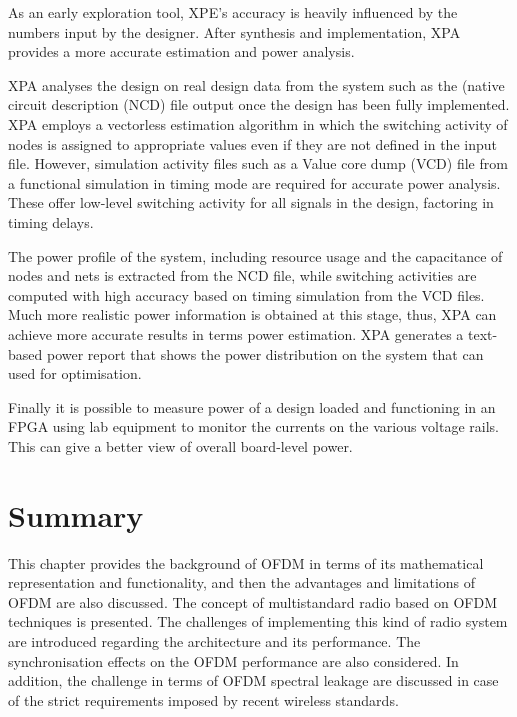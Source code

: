 As an early exploration tool, XPE's accuracy is heavily influenced by the numbers input by the designer.
After synthesis and implementation, XPA provides a more accurate estimation and power analysis.

XPA analyses the design on real design data from the system such as the (native circuit description (NCD) file output once the design has been fully implemented.
XPA employs a vectorless estimation algorithm in which the switching activity of nodes is assigned to appropriate values even if they are not defined in the input file.
However, simulation activity files such as a Value core dump (VCD) file from a functional simulation in timing mode are required for accurate power analysis.
These offer low-level switching activity for all signals in the design, factoring in timing delays.

The power profile of the system, including resource usage and the capacitance of nodes and nets is extracted from the NCD file, while switching activities are computed with high accuracy based on timing simulation from the VCD files. Much more realistic power information is obtained at this stage, thus, XPA can achieve more accurate results in terms power estimation.
XPA generates a text-based power report that shows the power distribution on the system that can used for optimisation.

Finally it is possible to measure power of a design loaded and functioning in an FPGA using lab equipment to monitor the currents on the various voltage rails. This can give a better view of overall board-level power.



\section{Summary}
This chapter provides the background of OFDM in terms of its mathematical representation and functionality, and then the advantages and limitations of OFDM are also discussed.
The concept of multistandard radio based on OFDM techniques is presented. The challenges of implementing this kind of radio system are introduced regarding the architecture and its performance.
The synchronisation effects on the OFDM performance are also considered.
In addition, the challenge in terms of OFDM spectral leakage are discussed in case of the strict requirements imposed by recent wireless standards.

